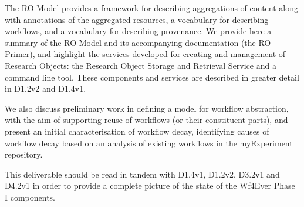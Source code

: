 \documentclass[a4paper, twoside, 11pt]{article}
\begin{document}
The RO Model provides a framework for describing aggregations of
content along with annotations of the aggregated resources, a
vocabulary for describing workflows, and a vocabulary for describing
provenance. We provide here a summary of the RO Model and its
accompanying documentation (the RO Primer), and highlight the services
developed for creating and management of Research Objects: the
Research Object Storage and Retrieval Service and a command line
tool. These components and services are described in greater detail in
D1.2v2 and D1.4v1.

We also discuss preliminary work in defining a model for workflow
abstraction, with the aim of supporting reuse of workflows (or their
constituent parts), and present an initial characterisation of
workflow decay, identifying causes of workflow decay based on an
analysis of existing workflows in the myExperiment repository.

This deliverable should be read in tandem with D1.4v1, D1.2v2, D3.2v1
and D4.2v1 in order to provide a complete picture of the state of the
Wf4Ever Phase I components. 

\clearpage

\tableofcontents
\clearpage
\listoftables %
\listoffigures %

\clearpage
\sloppy


















\appendix
\clearpage
{}


\label{lastpage}
\end{document}
